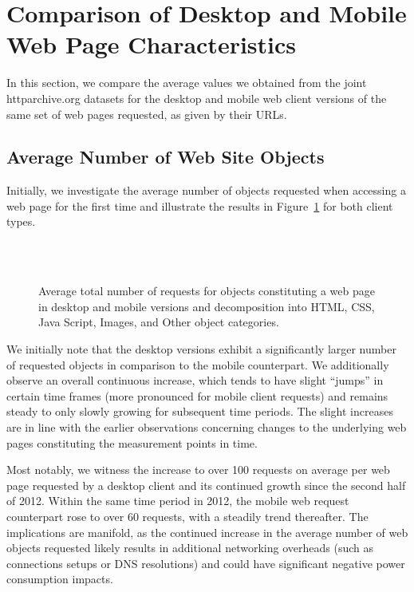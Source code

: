\documentclass[onecolumn,12pt]{IEEEtran}
\begin{document}
\section{Comparison of Desktop and Mobile Web Page Characteristics}
\label{s:compare}
In this section, we compare the average values we obtained from the joint httparchive.org datasets for the desktop and mobile web client versions of the same set of web pages requested, as given by their URLs.


\subsection{Average Number of Web Site Objects}
\label{ss:objects}
Initially, we investigate the average number of objects requested when accessing a web page for the first time and illustrate the results in Figure~\ref{fig:requests} for both client types.
\begin{figure}
\centering
	\\
	\qquad
	\\
\caption{Average total number of requests for objects constituting a web page in desktop and mobile versions and decomposition into  HTML, CSS, Java Script, Images, and Other object categories.\label{fig:requests}}
\end{figure}
We initially note that the desktop versions exhibit a significantly larger number of requested objects in comparison to the mobile counterpart.
We additionally observe an overall continuous increase, which tends to have slight ``jumps'' in certain time frames (more pronounced for mobile client requests) and remains steady to only slowly growing for subsequent time periods.
The slight increases are in line with the earlier observations concerning changes to the underlying web pages constituting the measurement points in time.

Most notably, we witness the increase to over 100 requests on average per web page requested by a desktop client and its continued growth since the second half of 2012.
Within the same time period in 2012, the mobile web request counterpart rose to over 60 requests, with a steadily trend thereafter. 
The implications are manifold, as the continued increase in the average number of web objects requested likely results in additional networking overheads (such as connections setups or DNS resolutions) and could have significant negative power consumption impacts.
\end{document}
